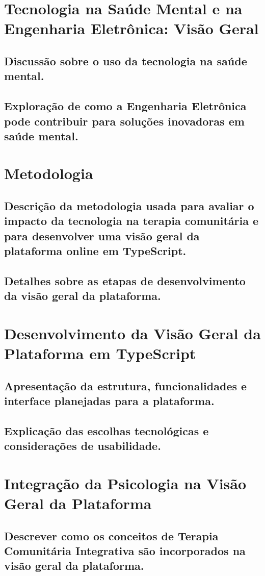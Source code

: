 \section{Tecnologia na Saúde Mental e na Engenharia Eletrônica: Visão Geral}
\subsection{Discussão sobre o uso da tecnologia na saúde mental.}
\subsection{Exploração de como a Engenharia Eletrônica pode contribuir para soluções inovadoras em saúde mental.}
\section{Metodologia}
\subsection{Descrição da metodologia usada para avaliar o impacto da tecnologia na terapia comunitária e para desenvolver uma visão geral da plataforma online em TypeScript.}
\subsection{Detalhes sobre as etapas de desenvolvimento da visão geral da plataforma.}
\section{Desenvolvimento da Visão Geral da Plataforma em TypeScript}
\subsection{Apresentação da estrutura, funcionalidades e interface planejadas para a plataforma.}
\subsection{Explicação das escolhas tecnológicas e considerações de usabilidade.}
\section{Integração da Psicologia na Visão Geral da Plataforma}
\subsection{Descrever como os conceitos de Terapia Comunitária Integrativa são incorporados na visão geral da plataforma.}

